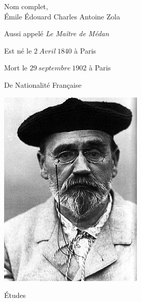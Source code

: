 \documentclass[12pt,a4paper]{article}
\begin{document}
\begin{cursive}
\begin{center}
        \shadowbox{\begin{large}
                \textcolor{black}{\'Emile Zola}
        \end{large}}
    \end{center}
    \vspace{0.5 cm}
\setlength{\columnseprule}{0.25pt}
\begin{multicols}{2}
 Nom complet,
\vspace{0.1 cm} \\ 
\'Emile \'Edouard Charles Antoine Zola\par
{} Aussi appelé \textit{Le Maître de Médan}\par
{} Est né le $2~Avril~1840$ à Paris \par
{} Mort le $29~septembre~1902$ à Paris\par
{} De Nationalité Fran\c caise\par
\centering

\includegraphics[scale=0.5]{Emile_Zola.png}
\end{multicols}
\dotfill
\begin{center}
 \'Etudes\par
\end{center}


\end{cursive}
\end{document}
